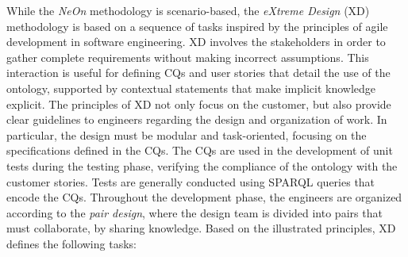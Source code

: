 While the \textit{NeOn} methodology is scenario-based, the \textit{eXtreme Design} (XD) methodology \cite{presutti2009extreme} is based on a sequence of tasks inspired by the principles of agile development in software engineering.
XD involves the stakeholders in order to gather complete requirements without making incorrect assumptions.
This interaction is useful for defining CQs and user stories that detail the use of the ontology, supported by contextual statements that make implicit knowledge explicit.
The principles of XD not only focus on the customer, but also provide clear guidelines to engineers regarding the design and organization of work.
In particular, the design must be modular and task-oriented, focusing on the specifications defined in the CQs.
The CQs are used in the development of unit tests during the testing phase, verifying the compliance of the ontology with the customer stories.
Tests are generally conducted using SPARQL queries that encode the CQs.
Throughout the development phase, the engineers are organized according to the \textit{pair design}, where the design team is divided into pairs that must collaborate, by sharing knowledge.
Based on the illustrated principles, XD defines the following tasks: 
